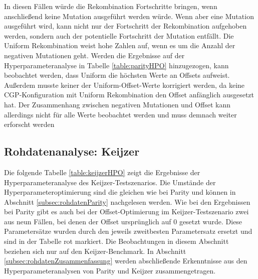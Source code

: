 In diesen Fällen würde die Rekombination Fortschritte bringen, wenn anschließend keine Mutation ausgeführt werden würde.
Wenn aber eine Mutation ausgeführt wird, kann nicht nur der Fortschritt der Rekombination aufgehoben werden, sondern auch der potentielle Fortschritt der Mutation entfällt.
Die Uniform Rekombination weist hohe Zahlen auf, wenn es um die Anzahl der negativen Mutationen geht. 
Werden die Ergebnisse auf der Hyperparameteranalyse in Tabelle \ref{table:parityHPO} hinzugezogen, kann beobachtet werden, dass Uniform die höchsten Werte an Offsets aufweist.
Außerdem musste keiner der Uniform-Offset-Werte korrigiert werden, da keine CGP-Konfiguration mit Uniform Rekombination den Offset anfänglich ausgesetzt hat.
Der Zusammenhang zwischen negativen Mutationen und Offset kann allerdings nicht für alle Werte beobachtet werden und muss demnach weiter erforscht werden

\subsection{Rohdatenanalyse: Keijzer}
\label{subsec:rohdatenKeijzer}

Die folgende Tabelle \ref{table:keijzerHPO} zeigt die Ergebnisse der Hyperparameteranalyse des Keijzer-Test\-sze\-narios.
Die Umstände der Hyperparameteroptimierung sind die gleichen wie bei Parity und können in Abschnitt \ref{subsec:rohdatenParity} nachgelesen werden.
Wie bei den Ergebnissen bei Parity gibt es auch bei der Offset-Optimierung im Keijzer-Testszenario zwei aus neun Fällen, bei denen der Offset ursprünglich auf 0 gesetzt wurde.
Diese Parametersätze wurden durch den jeweils zweitbesten Parametersatz ersetzt und sind in der Tabelle rot markiert.
Die Beobachtungen in diesem Abschnitt beziehen sich nur auf den Keijzer-Benchmark.
In Abschnitt \ref{subsec:rohdatenZusammenfassung} werden abschließende Erkenntnisse aus den Hyperparameteranalysen von Parity und Keijzer zusammengetragen.

